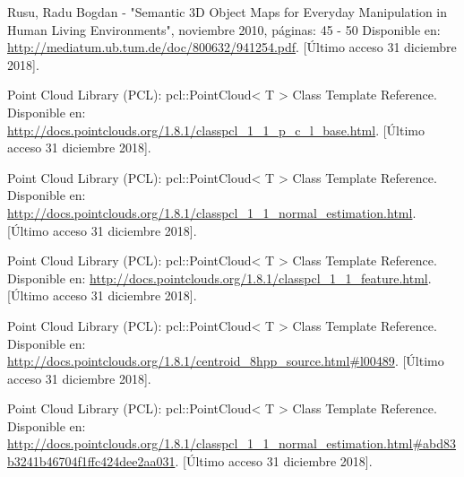 \begin{thebibliography}{99}
Rusu, Radu Bogdan - "Semantic 3D Object Maps for Everyday Manipulation in Human Living Environments", noviembre 2010, páginas: 45 - 50 Disponible en: \url{http://mediatum.ub.tum.de/doc/800632/941254.pdf}. [Último acceso 31 diciembre 2018].


 Point Cloud Library (PCL): pcl::PointCloud< T > Class Template Reference. Disponible en: \url{http://docs.pointclouds.org/1.8.1/classpcl_1_1_p_c_l_base.html}. [Último acceso 31 diciembre 2018].

 Point Cloud Library (PCL): pcl::PointCloud< T > Class Template Reference. Disponible en: \url{http://docs.pointclouds.org/1.8.1/classpcl_1_1_normal_estimation.html}. [Último acceso 31 diciembre 2018].

 Point Cloud Library (PCL): pcl::PointCloud< T > Class Template Reference. Disponible en: \url{http://docs.pointclouds.org/1.8.1/classpcl_1_1_feature.html}. [Último acceso 31 diciembre 2018].


 Point Cloud Library (PCL): pcl::PointCloud< T > Class Template Reference. Disponible en: \url{http://docs.pointclouds.org/1.8.1/centroid_8hpp_source.html#l00489}. [Último acceso 31 diciembre 2018].


 Point Cloud Library (PCL): pcl::PointCloud< T > Class Template Reference. Disponible en: \url{http://docs.pointclouds.org/1.8.1/classpcl_1_1_normal_estimation.html#abd83b3241b46704f1ffc424dee2aa031}. [Último acceso 31 diciembre 2018].







\end{thebibliography}
